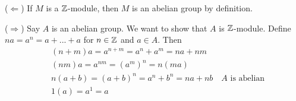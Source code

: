($\Leftarrow$) If $M$ is a $\Bbb Z$-module, then $M$ is an abelian group by definition.

($\Rightarrow$) Say $A$ is an abelian group. We want to show that $A$ is $\Bbb Z$-module. Define $na = a^n = a + ... +a$ for $n\in \Bbb Z$ and $a \in A$. Then 
\begin{align}
&(n+m)a = a^{n+m}=a^n+a^m= na + nm \\
&(nm)a = a^{nm} = (a^{m})^n = n(ma) \\
&n(a+b) = (a+b)^n = a^n + b^n = na + nb \quad \text{$A$ is abelian} \\
&1(a) = a^1 = a
\end{align}
